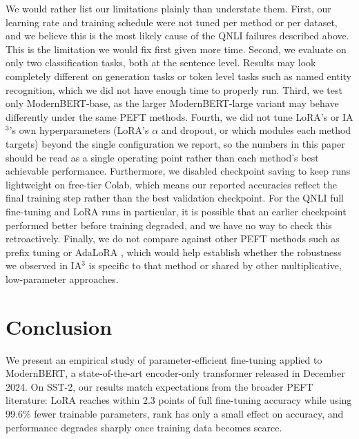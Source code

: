 \documentclass[11pt]{article}
\begin{document}
We would rather list our limitations plainly than understate them.
First, our learning rate and training schedule were not tuned per
method or per dataset, and we believe this is the most likely cause of
the QNLI failures described above. This is the limitation we would fix
first given more time. Second, we evaluate on only two classification
tasks, both at the sentence level. Results may look completely different
on generation tasks or token level tasks such as named entity
recognition, which we did not have enough time to properly run. Third, we test only
ModernBERT-base, as the larger ModernBERT-large variant may behave
differently under the same PEFT methods. Fourth, we did not tune LoRA's
or IA$^3$'s own hyperparameters (LoRA's $\alpha$ and dropout, or which
modules each method targets) beyond the single configuration we report,
so the numbers in this paper should be read as a single operating point
rather than each method's best achievable performance. Furthermore, we
disabled checkpoint saving to keep runs lightweight on free-tier Colab,
which means our reported accuracies reflect the final training step
rather than the best validation checkpoint. For the QNLI full
fine-tuning and LoRA runs in particular, it is possible that an earlier
checkpoint performed better before training degraded, and we have no way
to check this retroactively. Finally, we do not compare against other
PEFT methods such as prefix tuning or AdaLoRA \cite{zhang2022adalora},
which would help establish whether the robustness we observed in IA$^3$
is specific to that method or shared by other multiplicative,
low-parameter approaches.

\section{Conclusion}

We present an empirical study of parameter-efficient fine-tuning applied
to ModernBERT, a state-of-the-art encoder-only transformer released in
December 2024. On SST-2, our results match expectations from the broader
PEFT literature: LoRA reaches within 2.3 points of full fine-tuning
accuracy while using 99.6\% fewer trainable parameters, rank has only a
small effect on accuracy, and performance degrades sharply once training
data becomes scarce.
\end{document}
